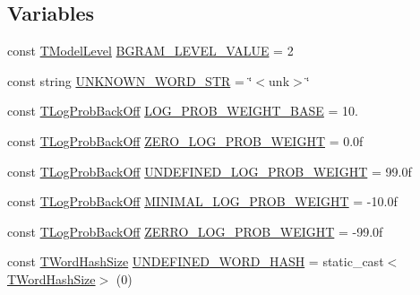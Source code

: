 \subsection*{Variables}
\begin{DoxyCompactItemize}
\item 
const \hyperlink{namespaceuva_1_1smt_1_1tries_a26064146e98856c7c4185efab0e61a36}{T\+Model\+Level} \hyperlink{namespaceuva_1_1smt_1_1tries_a5da2a0c71a6224ade6ea097e6b90bd3a}{B\+G\+R\+A\+M\+\_\+\+L\+E\+V\+E\+L\+\_\+\+V\+A\+L\+U\+E} = 2
\item 
const string \hyperlink{namespaceuva_1_1smt_1_1tries_aadd51d0ad0007db1d97769719dda1ff0}{U\+N\+K\+N\+O\+W\+N\+\_\+\+W\+O\+R\+D\+\_\+\+S\+T\+R} = \char`\"{}$<$unk$>$\char`\"{}
\item 
const \hyperlink{namespaceuva_1_1smt_1_1tries_acd0660255dd9ef5d644f01de49102750}{T\+Log\+Prob\+Back\+Off} \hyperlink{namespaceuva_1_1smt_1_1tries_ac729c4f31fd2bab9e8af8f6370344b87}{L\+O\+G\+\_\+\+P\+R\+O\+B\+\_\+\+W\+E\+I\+G\+H\+T\+\_\+\+B\+A\+S\+E} = 10.
\item 
const \hyperlink{namespaceuva_1_1smt_1_1tries_acd0660255dd9ef5d644f01de49102750}{T\+Log\+Prob\+Back\+Off} \hyperlink{namespaceuva_1_1smt_1_1tries_a60f325085f4d50c378efc2809a6fecc0}{Z\+E\+R\+O\+\_\+\+L\+O\+G\+\_\+\+P\+R\+O\+B\+\_\+\+W\+E\+I\+G\+H\+T} = 0.\+0f
\item 
const \hyperlink{namespaceuva_1_1smt_1_1tries_acd0660255dd9ef5d644f01de49102750}{T\+Log\+Prob\+Back\+Off} \hyperlink{namespaceuva_1_1smt_1_1tries_ae028201dd0a4a32686e5396de9919b07}{U\+N\+D\+E\+F\+I\+N\+E\+D\+\_\+\+L\+O\+G\+\_\+\+P\+R\+O\+B\+\_\+\+W\+E\+I\+G\+H\+T} = 99.\+0f
\item 
const \hyperlink{namespaceuva_1_1smt_1_1tries_acd0660255dd9ef5d644f01de49102750}{T\+Log\+Prob\+Back\+Off} \hyperlink{namespaceuva_1_1smt_1_1tries_a62d201889d19f6e5bad70de0b101ce75}{M\+I\+N\+I\+M\+A\+L\+\_\+\+L\+O\+G\+\_\+\+P\+R\+O\+B\+\_\+\+W\+E\+I\+G\+H\+T} = -\/10.\+0f
\item 
const \hyperlink{namespaceuva_1_1smt_1_1tries_acd0660255dd9ef5d644f01de49102750}{T\+Log\+Prob\+Back\+Off} \hyperlink{namespaceuva_1_1smt_1_1tries_a9592d33e326894227ec9d9c0a443aac6}{Z\+E\+R\+R\+O\+\_\+\+L\+O\+G\+\_\+\+P\+R\+O\+B\+\_\+\+W\+E\+I\+G\+H\+T} = -\/99.\+0f
\item 
const \hyperlink{namespaceuva_1_1smt_1_1hashing_acdc1f2765e669283f8e9c1ed42705314}{T\+Word\+Hash\+Size} \hyperlink{namespaceuva_1_1smt_1_1tries_a9b5fbcd66b62775091f4c2e9c28b1db9}{U\+N\+D\+E\+F\+I\+N\+E\+D\+\_\+\+W\+O\+R\+D\+\_\+\+H\+A\+S\+H} = static\+\_\+cast$<$\hyperlink{namespaceuva_1_1smt_1_1hashing_acdc1f2765e669283f8e9c1ed42705314}{T\+Word\+Hash\+Size}$>$ (0)

\end{DoxyCompactItemize}
